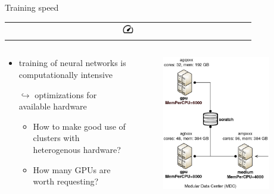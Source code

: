 \documentclass[compress,aspectratio=169]{beamer}
\begin{document}
\begin{frame}{Training speed 
              \begin{tabular}{@{}c@{}}
                  \includegraphics[width=0.05\textwidth]{assets/speed_FILL0_wght400_GRAD0_opsz48.png}
              \end{tabular}
              }

    \vspace{-3em}

    \begin{columns}
        \begin{column}{0.6\textwidth}
            \begin{itemize}
                \item training of neural networks is computationally intensive
                \vspace{1em}
                \item[$\hookrightarrow$] optimizations for available hardware
                    \begin{itemize}
                        \item How to make good use of clusters with heterogenous hardware?
                        \item How many GPUs are worth requesting?
                    \end{itemize}
            \end{itemize}
        \end{column}
        \begin{column}{0.4\textwidth}
            \vspace{-1em}
            \begin{figure}
                \includegraphics[width=0.9\textwidth]{assets/gwdg_scc.png}

\end{figure}
\end{column}
\end{columns}
\end{frame}
\end{document}
